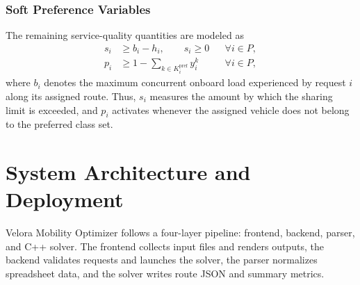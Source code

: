 \documentclass[11pt,a4paper]{article}
\begin{document}
\subsubsection{Soft Preference Variables}
The remaining service-quality quantities are modeled as
\begin{align}
s_i &\ge b_i-h_i, \qquad s_i \ge 0 && \forall i\in P , \label{eq:sharing-slack}\\
p_i &\ge 1-\sum_{k\in K_i^{\mathrm{pref}}} y_i^k && \forall i\in P , \label{eq:pref-slack}
\end{align}
where $b_i$ denotes the maximum concurrent onboard load experienced by request $i$ along its assigned route. Thus, $s_i$ measures the amount by which the sharing limit is exceeded, and $p_i$ activates whenever the assigned vehicle does not belong to the preferred class set.

\FloatBarrier
\section{System Architecture and Deployment}
\label{sec:architecture}

Velora Mobility Optimizer follows a four-layer pipeline: frontend, backend, parser, and C++ solver. The frontend collects input files and renders outputs, the backend validates requests and launches the solver, the parser normalizes spreadsheet data, and the solver writes route JSON and summary metrics.
\end{document}
